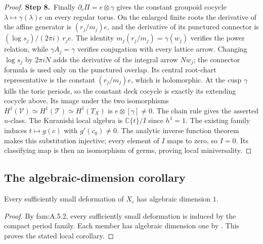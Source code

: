 \begin{proof}
\par\smallskip\noindent\textbf{Step 8.}\ Finally $\partial_c\Pi=e\otimes\gamma$ gives the constant
groupoid cocycle $\lambda\mapsto\gamma(\lambda)e$ on every
regular torus.  On the enlarged finite roots the derivative of the
affine generator is $(r_j/m_j)e$, and the derivative of its
punctured connector is $(\log s_j)/(2\pi i)\,r_je$.
The identity $m_j(r_j/m_j)=\gamma(w_j)$ verifies the power
relation, while $\gamma A_j=\gamma$ verifies conjugation with
every lattice arrow.  Changing $\log s_j$ by $2\pi i N$
adds the derivative of the integral arrow $Nw_j$; the connector
formula is used only on the punctured overlap.  Its central
root-chart representative is the constant $(r_j/m_j)e$,
which is holomorphic.  At the cusp $\gamma$ kills the toric periods,
so the constant deck cocycle is exactly its extending cocycle
above.  Its image under the two isomorphisms
$H^1(\mathcal V)\simeq H^1(\mathcal T)\simeq H^1(T_X)$
is $e\otimes[\gamma]\ne0$.  The chain rule gives the asserted
$u$-class.  The Kuranishi local algebra is
$\mathbb C\{t\}/I$ since $h^1=1$.  The existing family induces
$t\mapsto g(c)$ with $g'(c_0)\ne0$.  The analytic inverse
function theorem makes this substitution injective; every
element of $I$ maps to zero, so $I=0$.  Its classifying map is
then an isomorphism of germs, proving local miniversality.
\end{proof}

\subsection{The algebraic-dimension corollary}\label{sec:algebraic-dimension-nearby}

\begin{corollary}\label{fam:A.5.2-corollary}
Every sufficiently small deformation of $X_c$ has algebraic dimension $1$.
\end{corollary}

\begin{proof}
By fam:A.5.2, every sufficiently small deformation is induced by the compact period family. Each member has algebraic dimension one by \cite[Theorem 9.1(i)]{AC26}. This proves the stated local corollary.
\end{proof}
